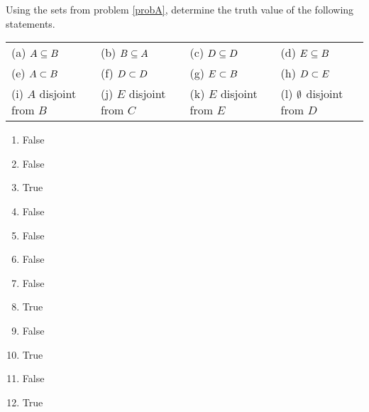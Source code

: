\begin{questions}
 Using the sets from problem \ref{probA}, determine the truth value
of the following statements.

\begin{tabular}{p{1.5in}p{1.5in}p{1.5in}p{1in}}
	(a) $A \subseteq B$	& (b) $B \subseteq A$ 	& (c) $D \subseteq D$ 	& (d) $E \subseteq B$ \\
	(e) $A \subset B$ 	& (f) $D \subset D$ & (g) $E \subset B$ & (h) $D \subset E$ \\
	(i) $A$ disjoint from $B$ & (j) $E$ disjoint from $C$ & (k) $E$ disjoint
from $E$ & (l) $\emptyset$ disjoint from $D$ 
\end{tabular}
   \ifprintanswers
        \vspace{-17pt}
    \fi
\begin{solution}
    \begin{enumerate}[label=(\alph*),itemsep=2pt,parsep=0pt,topsep=0pt,partopsep=0pt]
        \item False  %
        \item False 
        \item True 
        \item False 
        \item False  %
        \item False 
        \item False 
        \item True 
        \item False  %
        \item True 
        \item False 
        \item True  
    \end{enumerate}
\end{solution}
 





\end{questions}
